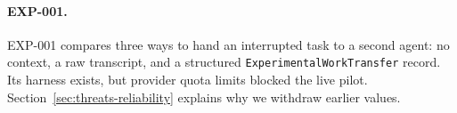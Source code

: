 \paragraph{EXP-001.} EXP-001 compares three ways to hand an interrupted task to a second agent: no context, a raw transcript, and a structured \texttt{ExperimentalWorkTransfer} record. Its harness exists, but provider quota limits blocked the live pilot. Section~\ref{sec:threats-reliability} explains why we withdraw earlier values.
